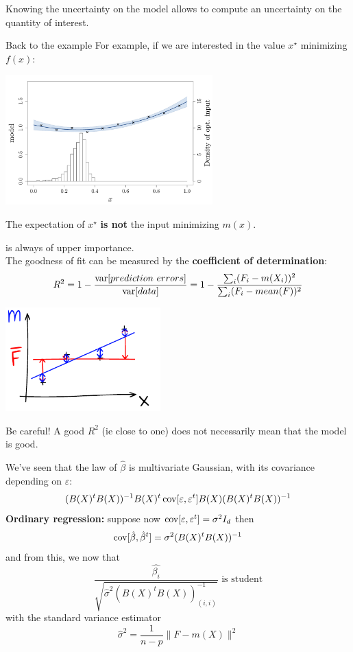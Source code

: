 \begin{frame}{}
Knowing the uncertainty on the model allows to compute an uncertainty on the quantity of interest.
\begin{exampleblock}{Back to the example}
For example, if we are interested in the value $x^\star$ minimizing $f(x)$:
\begin{center}
  \includegraphics[height=5cm]{1_stat_models/figures/R/linreg_6}
\end{center}
\end{exampleblock}
\alert{The expectation of $x^\star$ \textbf{is not} the input minimizing $m(x).$}
\end{frame}


\begin{frame}{}
\textbf{} is always of upper importance.\\
\vspace{3mm}
The goodness of fit can be measured by the \textbf{coefficient of determination}:
$$R^2 =  1 - \frac{\operatorname*{var}[prediction\ errors]}{\operatorname*{var}[data]} = 1 - \frac{\sum_i (F_i-m(X_i))^2}{\sum_i (F_i-mean(F))^2}$$
\begin{center}
  \includegraphics[height=4cm]{1_stat_models/figures/ink_R2}
\end{center}
\alert{Be careful!} A good $R^2$ (ie close to one) does not necessarily mean that the model is good.
\end{frame}

\begin{frame}{}
	We've seen that the law of $\hat{\beta}$ is multivariate Gaussian, with its covariance depending on $\varepsilon$:
	$$(B(X)^t B(X))^{-1} B(X)^t \operatorname*{cov}[\varepsilon,\varepsilon^t] B(X) (B(X)^t B(X))^{-1}$$
	\textbf{Ordinary regression:} suppose now $\operatorname*{cov}[\varepsilon,\varepsilon^t]=\sigma^2I_d$ then
	$$ \operatorname*{cov}[\hat{\beta},\hat{\beta}^t] = \sigma^2(B(X)^tB(X))^{-1}$$
	and from this, we now that
	$$ \frac{\hat{\beta_i}}{\sqrt{\hat{\sigma}^2(B(X)^tB(X))^{-1}_{(i,i)}}}\text{ is student}$$
	with the standard variance estimator
	$$ \hat{\sigma}^2=\frac{1}{n-p}\lVert F-m(X)\rVert^2 $$
\end{frame}


